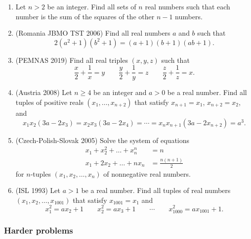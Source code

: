 \documentclass[11pt,paper=letter]{scrartcl}
\begin{document}
\begin{enumerate}

\item Let $n > 2$ be an integer. Find all sets of $n$ real numbers such that each number is the sum of the squares of the other $n - 1$ numbers. \hint{\ref{h:1}}

\item (Romania JBMO TST 2006) Find all real numbers $a$ and $ b$ such that
\[ 2(a^2 + 1)(b^2 + 1) = (a + 1)(b + 1)(ab + 1). \]

\item (PEMNAS 2019) Find all real triples $(x, y, z)$ such that
\[ \frac x 2 + \frac1x = y \qquad \frac y 2 + \frac1y = z \qquad \frac z 2 + \frac1z = x. \]
\hint{\ref{h:1}}

\item (Austria 2008) Let $n \ge 4$ be an integer and $a > 0$ be a real number. Find all tuples of positive reals $(x_1, \ldots, x_{n+2})$ that satisfy $x_{n+1} = x_1$, $x_{n+2} = x_2$, and \[
  x_1x_2(3a - 2x_3) = x_2x_3(3a - 2x_4) = \cdots =
  x_nx_{n+1}(3a - 2x_{n+2}) = a^3.
\]
\hint{\ref{h:2}}

\item (Czech-Polish-Slovak 2005) Solve the system of equations
\begin{align*}
  x_1+x_2^2+\dots+x_n^n&=n \\
  x_1+2x_2+\dots+nx_n&=\frac{n(n+1)}{2}
\end{align*}
for $n$-tuples $(x_1, x_2, \dots, x_n)$ of nonnegative real numbers.
\hint{\ref{h:3}}

\item (ISL 1993) Let $a > 1$ be a real number. Find all tuples of real numbers $(x_1, x_2, \ldots, x_{1001})$ that satisfy $x_{1001} = x_1$ and \[
  x_1^2 = ax_2 + 1 \qquad
  x_2^2 = ax_3 + 1 \qquad
  \cdots \qquad
  x_{1000}^2 = ax_{1001} + 1.
  \]
\hints{\ref{h:1} \ref{h:4}}

\end{enumerate}

\subsubsection*{Harder problems}
\end{document}
